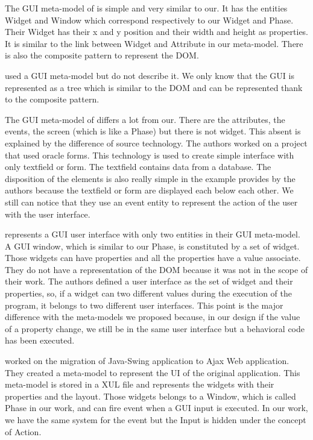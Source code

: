 \documentclass[conference]{IEEEtran}
\begin{document}
The GUI meta-model of \citet{sanchez2014model} is simple 
    and very similar to our.
It has the entities Widget and Window which correspond respectively to
    our Widget and Phase.
Their Widget has their x and y position and their width and height as properties.
It is similar to the link between Widget and Attribute in our meta-model.
There is also the composite pattern to represent the DOM.

\citet{morgado2011reverse} used a GUI meta-model but do not describe it.
We only know that the GUI is represented as a tree which is similar to
    the DOM and can be represented thank to the composite pattern.

The GUI meta-model of \citet{garces2017white} differs a lot from our.
There are the attributes, the events, the screen (which is like a Phase)
    but there is not widget.
This absent is explained by the difference of source technology.
The authors worked on a project that used oracle forms.
This technology is used to create simple interface with only
    textfield or form.
The textfield contains data from a database.
The disposition of the elements is also really simple in the example provides
    by the authors because the textfield or form are displayed each below each other.
We still can notice that they use an event entity to represent the action of the user with the
    user interface.

\citet{MemonWCRE2003} represents a GUI user interface with only two entities in their GUI meta-model.
A GUI window, which is similar to our Phase, is constituted by a set of widget.
Those widgets can have properties and all the properties have a value associate.
They do not have a representation of the DOM because it was not in the scope of
    their work.
The authors defined a user interface as the set of widget and their properties,
    so, if a widget can two different values during the execution of the program, 
    it belongs to two different user interfaces.
This point is the major difference with the meta-models we proposed because,
    in our design if the value of a property change, we still be in the same user interface
    but a behavioral code has been executed.

\citet{samir2007swing2script} worked on the migration of Java-Swing application to Ajax Web application.
They created a meta-model to represent the UI of the original application.
This meta-model is stored in a XUL file and represents
    the widgets with their properties and the layout.
Those widgets belongs to a Window, which is called Phase in our work, and
    can fire event when a GUI input is executed.
In our work, we have the same system for the event but the Input is hidden under the concept of Action.
\end{document}
